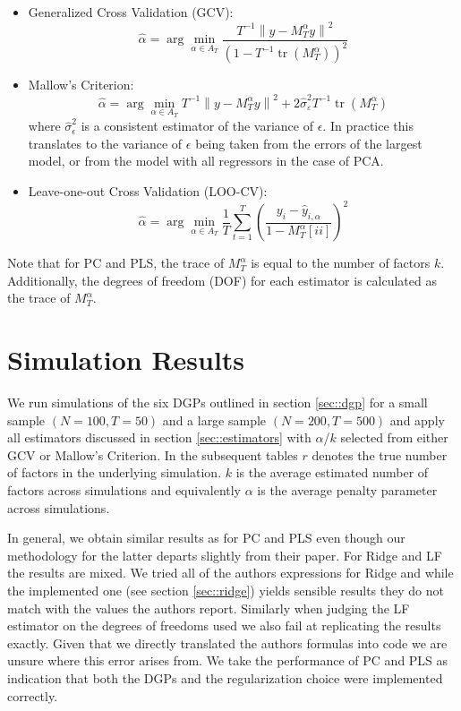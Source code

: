 \begin{itemize}
	\item Generalized Cross Validation (GCV): \\
\[\hat{\alpha}=\arg \min _{\alpha \in A_{T}} \frac{T^{-1}\left\|y-M_{T}^{\alpha} y\right\|^{2}}{\left(1-T^{-1} \operatorname{tr}\left(M_{T}^{\alpha}\right)\right)^{2}}\]

	\item Mallow's Criterion: \\
\[\hat{\alpha}=\arg \min _{\alpha \in A_{T}} T^{-1}\left\|y-M_{T}^{\alpha} y\right\|^{2}+2 \widehat{\sigma}_{\varepsilon}^{2} T^{-1} \operatorname{tr}\left(M_{T}^{\alpha}\right)\]
where $\widehat{\sigma}_{\epsilon}^{2}$ is a consistent estimator of the variance of $\epsilon$. In practice this translates to the variance of $\epsilon$ being taken from the errors of the largest model, or from the model with all regressors in the case of PCA.

	\item Leave-one-out Cross Validation (LOO-CV): \\
\[\hat{\alpha}=\arg \min _{\alpha \in A_{T}} \frac{1}{T} \sum_{t=1}^{T}\left(\frac{y_{i}-\hat{y}_{i, \alpha}}{1-M_{T}^{\alpha}[ii]}\right)^{2}\]

\end{itemize}

Note that for PC and PLS, the trace of $M_{T}^{\alpha}$ is equal to the number of factors $k$. Additionally, the degrees of freedom (DOF) for each estimator is calculated as the trace of $M_{T}^{\alpha}$. 

\section{Simulation Results}

We run simulations of the six DGPs outlined in section \ref{sec::dgp} for a small sample $(N = 100, T = 50)$ and a large sample $(N=200, T=500)$ and apply all estimators discussed in section \ref{sec::estimators} with $\alpha$/$k$ selected from either GCV or Mallow's Criterion. In the subsequent tables $r$ denotes the true number of factors in the underlying simulation. $k$ is the average estimated number of factors across simulations and equivalently $\alpha$ is the average penalty parameter across simulations.



In general, we obtain similar results as \citeauthor{carrasco2016sample} for PC and PLS even though our methodology for the latter departs slightly from their paper. For Ridge and LF the results are mixed. We tried all of the authors expressions for Ridge and while the implemented one (see section \ref{sec::ridge}) yields sensible results they do not match with the values the authors report. Similarly when judging the LF estimator on the degrees of freedoms used we also fail at replicating the results exactly. Given that we directly translated the authors formulas into code we are unsure where this error arises from. We take the performance of PC and PLS as indication that both the DGPs and the regularization choice were implemented correctly. 

